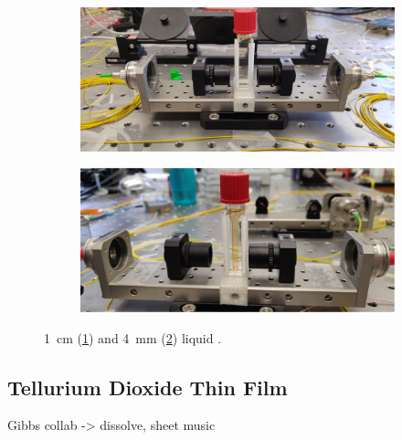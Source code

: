 \begin{figure}[t]
    \centering
    \begin{subfigure}[b]{0.49\textwidth}
        \centering
        \includegraphics[width=\textwidth]{figs/4-Raman/1cmCS2.jpeg}
        \caption{}
        \label{fig:Raman:1cmCS2}
    \end{subfigure}
    \hfill
    \begin{subfigure}[b]{0.49\textwidth}
        \centering
        \includegraphics[width=\textwidth]{figs/4-Raman/4mmCS2.jpg}
        \caption{}
        \label{fig:Raman:4mmCS2}
    \end{subfigure}
    \caption{\SI{1}{\centi\meter} (\ref{fig:Raman:1cmCS2}) and \SI{4}{\milli\meter} (\ref{fig:Raman:4mmCS2}) liquid .}
    \label{fig:Raman:CS2Cuvet}
\end{figure}

\subsection{Tellurium Dioxide Thin Film}
\label{subsec:Raman:Target:TeO2}

Gibbs collab -> dissolve, sheet music


